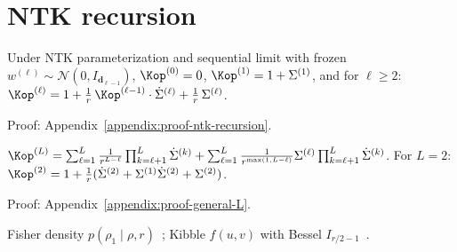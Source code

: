 \section{NTK recursion}\label{sec:recursion}

\begin{theorem}\label{thm:ntk_recursion}
Under NTK parameterization and sequential limit with frozen \( w^{(\ell)} \sim \mathcal{N}(0, I_{\bm{d}_{\ell-1}}) \),
\( \Kop^{(0)}=0 \), \( \Kop^{(1)} = 1 + \Sigma^{(1)} \), and for \( \ell\ge 2 \):
\( \Kop^{(\ell)} = 1 + \frac{1}{r}\,\Kop^{(\ell-1)}\cdot\dot{\Sigma}^{(\ell)} + \frac{1}{r}\,\Sigma^{(\ell)} \).
\end{theorem}
Proof: Appendix~\ref{appendix:proof-ntk-recursion}.

\begin{corollary}\label{cor:general_L_layer_ntk}
\( \Kop^{(L)} = \sum_{\ell=1}^{L} \frac{1}{r^{L-\ell}}\prod_{k=\ell+1}^{L}\dot{\Sigma}^{(k)} + \sum_{\ell=1}^{L} \frac{1}{r^{\max(1,L-\ell)}}\Sigma^{(\ell)}\prod_{k=\ell+1}^{L}\dot{\Sigma}^{(k)} \). For \( L=2 \): \( \Kop^{(2)} = 1 + \frac{1}{r}(\dot{\Sigma}^{(2)} + \Sigma^{(1)}\dot{\Sigma}^{(2)} + \Sigma^{(2)}) \).
\end{corollary}
Proof: Appendix~\ref{appendix:proof-general-L}.

\begin{remark}\label{rmk:fisher-kibble-law}
Fisher density \( p(\rho_1\mid\rho,r) \)~\cite{fisher1915probable}; Kibble \( f(u,v) \) with Bessel \( I_{r/2-1} \)~\cite{kibble1941two}.
\end{remark}
